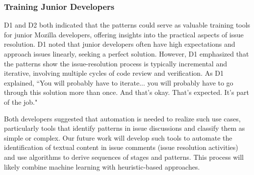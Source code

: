 {\subsubsection{\textbf{Training Junior Developers}} 
D1 and D2 both indicated that the patterns could serve as valuable training tools for junior Mozilla developers, offering insights into the practical aspects of issue resolution. D1 noted that junior developers often have high expectations and approach issues linearly, seeking a perfect solution. However, D1 emphasized that the patterns show the issue-resolution process is typically incremental and iterative, involving multiple cycles of code review and verification. As D1 explained, ``You will probably have to iterate... you will probably have to go through this solution more than once. And that's okay. That's expected. It's part of the job." 

Both developers suggested that automation is needed to realize such use cases, particularly tools that identify patterns in issue discussions and classify them as simple or complex. Our future work will develop such tools to automate the identification of textual content in issue comments (\eg issue resolution activities) and use algorithms to derive sequences of stages and patterns. This process will likely combine machine learning with heuristic-based approaches.

}

